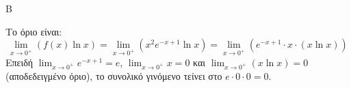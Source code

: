 \begin{thema}{Β}
\begin{erwthma}
\item Το όριο είναι:
\[ \lim_{x\to0^+} (f(x) \ln x) = \lim_{x\to0^+} (x^2 e^{-x+1} \ln x) = \lim_{x\to0^+} ( e^{-x+1} \cdot x \cdot (x \ln x) ) \]
Επειδή $\lim_{x\to0^+} e^{-x+1} = e$, $\lim_{x\to0^+} x = 0$ και $\lim_{x\to0^+} (x \ln x) = 0$ (αποδεδειγμένο όριο), το συνολικό γινόμενο τείνει στο $e \cdot 0 \cdot 0 = 0$.
\end{erwthma}
\end{thema}
